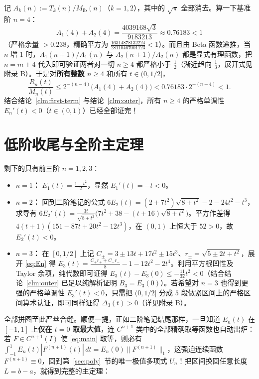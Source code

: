 \documentclass[UTF8,fontset=windows,a4paper,11pt]{ctexart}
\newcommand{\Lone}[1]{\lVert #1\rVert_1}
\begin{document}
记 $A_k(n):=T_k(n)/M_{\mathrm{lb}}(n)$（$k=1,2$），其中的 $\sqrt\pi$ 全部消去。算一下基准阶 $n=4$：
\[
    A_1(4)+A_2(4) = \frac{4039168\sqrt3}{9183213} \approx 0.76183 < 1
\]
（严格余量 $>0.238$，精确平方为 $\frac{16314878132224}{28110467001123}<1$）。而且由 Beta 函数递推，当 $n$ 增 $1$ 时，$A_1(n+1)/A_1(n)$ 与 $A_2(n+1)/A_2(n)$ 都是显式有理函数，把 $n=m+4$ 代入即可验证两者对一切 $n\ge 4$ 都严格小于 $\frac12$（渐近趋向 $\frac13$，展开式见附录 B）。于是对\textbf{所有整数 $n\ge 4$} 和所有 $t\in(0,1/2]$，
\[
    \frac{R_n(t)}{M_n(t)} \le 2^{-(n-4)}\bigl(A_1(4)+A_2(4)\bigr) < 0.76183\cdot 2^{-(n-4)} < 1.
\]
结合结论~\ref{clm:first-term} 与结论~\ref{clm:outer}，所有 $n\ge 4$ 的严格单调性 $E_n'(t)<0$（$t\in(0,1)$）已经全部证完！

\section{低阶收尾与全阶主定理}
\label{sec:finish}

剩下的只有前三阶 $n=1,2,3$：
\begin{itemize}
    \item \textbf{$n=1$：} $E_1(t)=\frac{1-t^2}{2}$，显然 $E_1'(t)=-t<0$。
    \item \textbf{$n=2$：} 回到二阶笔记的公式 $6E_2(t)=(2+7t^2)\sqrt{8+t^2}-2-24t^2-t^3$，求导有 $6E_2'(t)=\frac{3t}{\sqrt{8+t^2}}\bigl(7t^2+38-(t+16)\sqrt{8+t^2}\bigr)$。平方作差得 $4(t+1)(151-87t+20t^2-12t^3)$，在 $(0,1)$ 上恒大于 $52>0$，故 $E_2'(t)<0$。
    \item \textbf{$n=3$：} 在 $[0,1/2]$ 上记 $C_\pm=3\pm 13t+17t^2\pm 15t^3$、$r_\pm=\sqrt{5\pm 2t+t^2}$，展开 \eqref{eq:En} 得 $E_3(t)=\frac{C_+r_++C_-r_-}{8}-1-12t^2-2t^4$。利用平方根凹性及 Taylor 余项，纯代数即可证得 $E_3(t)-E_3(0)\le -\frac{11}{32}t^2<0$（结合结论~\ref{clm:outer} 已足以纯解析证明 $B_3=E_3(0)$）。若希望对 $n=3$ 也得到更强的严格单调性 $E_3'(t)<0$，只需把 $(0,1/2]$ 分成 $5$ 段做紧区间上的严格区间算术认证，即可同样证得 $\Delta_3(t)>0$（详见附录 B）。
\end{itemize}

全部拼图至此严丝合缝。顺便一提，正如二阶笔记结尾那样，一旦知道 $E_n(t)$ 在 $[-1,1]$ 上\textbf{仅在 $t=0$ 取最大值}，连 $C^{n+1}$ 类中的全部精确取等函数也自动出炉：若 $F\in C^{n+1}(I)$ 使 \eqref{eq:main} 取等，则必有 $\int_{-1}^{1}E_n(t)|F^{(n+1)}(t)|\,dt=E_n(0)\Lone{F^{(n+1)}}$，这强迫连续函数 $F^{(n+1)}\equiv 0$，回到第~\ref{sec:poly}~节的唯一极值多项式 $U_n$！把区间换回任意长度 $L=b-a$，就得到完整的主定理：
\end{document}
